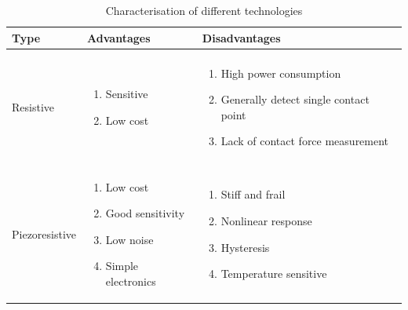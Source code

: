 \documentclass[english]{article}
\begin{document}
\begin{table}
 \begin{center}
  \caption{Characterisation of different technologies\cite{types}\label{tab:types}}
    \begin{tabular}{ l l l }    
    	\hline
  	   Type  				     & 			Advantages 				& 			Disadvantages  \\ \hline\\
  	   Resistive 				
  	   
  	    & 
  	   
\begin{minipage}{2.5in}									
    \begin{enumerate}
   \item Sensitive
   \item Low cost
   \end{enumerate}
 \end{minipage}  
 
 &
 
\begin{minipage}{2.5in}									
    \begin{enumerate}
   \item High power consumption
   \item Generally detect single contact point
   \item Lack of contact force measurement
   \end{enumerate}
 \end{minipage} 
 
 \\\\\hline
 
 
  	   Piezoresistive 	
  	   
  	   &
  	   
 \begin{minipage}{2.5in}									
    \begin{enumerate}
   \item Low cost
   \item Good sensitivity
   \item Low noise
   \item Simple electronics
   \end{enumerate}
 \end{minipage} 
 
  &
 
\begin{minipage}{2.5in}									
    \begin{enumerate}
   \item Stiff and frail
   \item Nonlinear response
   \item Hysteresis
   \item Temperature sensitive
   \end{enumerate}
 \end{minipage}
 

\end{tabular}
\end{center}
\end{table}
\end{document}
